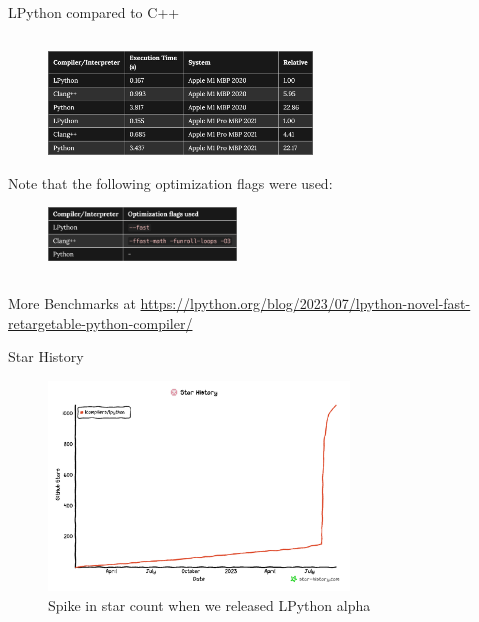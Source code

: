 \begin{frame}{LPython compared to C++}
    \begin{columns}
        \begin{column}{0.6\textwidth}
            \begin{figure}
                \centering
                \includegraphics[width=7cm]{images/benchmark.png}
            \end{figure}
            \scriptsize \centering Note that the following optimization flags were used:
            \begin{figure}
                \centering
                \includegraphics[width=5cm]{images/optimization-flags.png}
            \end{figure}
        \end{column}
    \end{columns}
    \scriptsize
    More Benchmarks at \href{https://lpython.org/blog/2023/07/lpython-novel-fast-retargetable-python-compiler/}{https://lpython.org/blog/2023/07/lpython-novel-fast-retargetable-python-compiler/}
\end{frame}

\begin{frame}{Star History}
    \begin{figure}
        \centering
        \includegraphics[width=8cm]{images/star-history.png}
        \caption{Spike in star count when we released LPython alpha}
    \end{figure}   
\end{frame}

